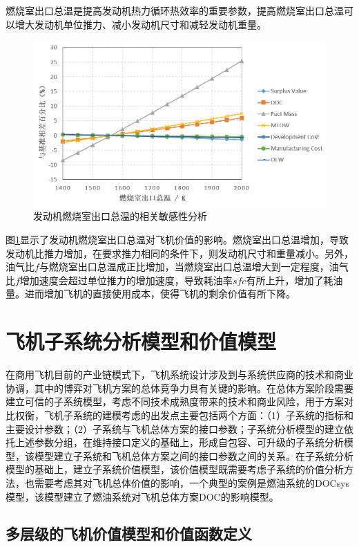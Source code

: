 \documentclass[12pt,a4paper]{report}
\begin{document}
燃烧室出口总温是提高发动机热力循环热效率的重要参数，提高燃烧室出口总温可以增大发动机单位推力、减小发动机尺寸和减轻发动机重量。
 \begin{figure}[!htp]
  \centering
  \includegraphics[width=.9\textwidth]{eps/SVvsTt4.jpg}
  \caption{发动机燃烧室出口总温的相关敏感性分析}
 \label{fig:Tt4sens}
\end{figure}
图\ref{fig:Tt4sens}显示了发动机燃烧室出口总温对飞机价值的影响。燃烧室出口总温增加，导致发动机比推力增加，在要求推力相同的条件下，则发动机尺寸和重量减小。另外，油气比$f$与燃烧室出口总温成正比增加，当燃烧室出口总温增大到一定程度，油气比$f$增加速度会超过单位推力的增加速度，导致耗油率$sfc$有所上升，增加了耗油量。进而增加飞机的直接使用成本，使得飞机的剩余价值有所下降。


\section{飞机子系统分析模型和价值模型}

在商用飞机目前的产业链模式下，飞机系统设计涉及到与系统供应商的技术和商业协调，其中的博弈对飞机方案的总体竞争力具有关键的影响。在总体方案阶段需要建立可信的子系统模型，考虑不同技术成熟度带来的技术和商业风险，用于方案对比权衡，飞机子系统的建模考虑的出发点主要包括两个方面：（1）子系统的指标和主要设计参数；（2）子系统与飞机总体方案的接口参数；子系统分析模型的建立依托上述参数分组，在维持接口定义的基础上，形成自包容、可升级的子系统分析模型，该模型建立子系统和飞机总体方案之间的接口参数之间的关系。在子系统分析模型的基础上，建立子系统价值模型，该价值模型既需要考虑子系统的价值分析方法，也需要考虑其对飞机总体价值的影响，一个典型的案例是燃油系统的DOCsys模型，该模型建立了燃油系统对飞机总体方案DOC的影响模型。

\subsection{多层级的飞机价值模型和价值函数定义}
\end{document}

